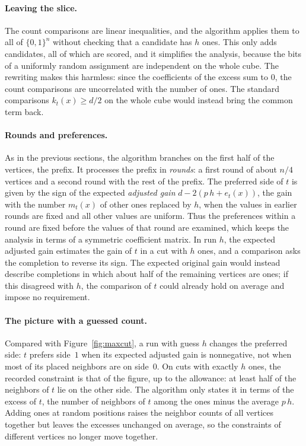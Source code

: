 \documentclass[11pt,a4paper]{article}
\theoremstyle{definition}
\theoremstyle{remark}
\newcommand{\bits}{\{0,1\}}
\begin{document}
\paragraph{Leaving the slice.}
The count comparisons are linear inequalities, and the algorithm applies
them to all of $\bits^n$ without checking that a candidate has $h$ ones.
This only adds candidates, all of which are scored, and it simplifies the
analysis, because the bits of a uniformly random assignment are
independent on the whole cube. The rewriting makes this harmless: since
the coefficients of the excess sum to $0$, the count comparisons are
uncorrelated with the number of ones. The standard comparisons
$k_t(x)\ge d/2$ on the whole cube would instead bring the common term back.

\paragraph{Rounds and preferences.}
As in the previous sections, the algorithm branches on the first half of
the vertices, the prefix. It processes the prefix in \emph{rounds}: a first
round of about $n/4$ vertices and a second round with the rest of the
prefix. The preferred side of $t$ is given by the sign of the expected
\emph{adjusted gain} $d-2(p\,h+e_t(x))$, the gain with the number $m_t(x)$
of other ones replaced by $h$, when the values in earlier rounds are fixed
and all other values are uniform. Thus the preferences within a round are
fixed before the values of that round are examined, which keeps the
analysis in terms of a symmetric coefficient matrix. In run $h$, the
expected adjusted gain estimates the gain of $t$ in a cut with $h$ ones,
and a comparison asks the completion to reverse its sign. The expected
original gain would instead describe completions in which about half of
the remaining vertices are ones; if this disagreed with $h$, the comparison
of $t$ could already hold on average and impose no requirement.

\paragraph{The picture with a guessed count.}
Compared with Figure~\ref{fig:maxcut}, a run with guess $h$ changes the
preferred side: $t$ prefers side~$1$ when its expected adjusted gain is
nonnegative, not when most of its placed neighbors are on side~$0$. On cuts
with exactly $h$ ones, the recorded constraint is that of the figure, up to
the allowance: at least half of the neighbors of $t$ lie on the other side.
The algorithm only states it in terms of the excess of $t$, the number of
neighbors of $t$ among the ones minus the average $p\,h$. Adding ones at
random positions raises the neighbor counts of all vertices together but
leaves the excesses unchanged on average, so the constraints of different
vertices no longer move together.
\end{document}
